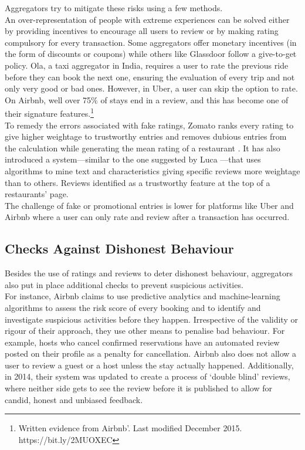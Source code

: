 \documentclass[a4paper, 12pt]{article}
\begin{document}
Aggregators try to mitigate these risks using a few methods.\\

An over-representation of people with extreme experiences can be solved either by providing incentives to encourage all users to review or by making rating compulsory for every transaction. Some aggregators offer monetary incentives (in the form of discounts or coupons) while others like Glassdoor follow a give-to-get policy. Ola, a taxi aggregator in India, requires a user to rate the previous ride before they can book the next one, ensuring the evaluation of every trip and not only very good or bad ones. However, in Uber, a user can skip the option to rate. On Airbnb, well over 75\% of stays end in a review, and this has become one of their signature features.\footnote {Written evidence from Airbnb’. Last modified December 2015. https://bit.ly/2MUOXEC} \\

To remedy the errors associated with fake ratings, Zomato ranks every rating to give higher weightage to trustworthy entries and removes dubious entries from the calculation while generating the mean rating of a restaurant \parencite{GoyalD2012}. It has also introduced a system—similar to the one suggested by Luca \parencite{luca2016reviews}—that uses algorithms to mine text and characteristics giving specific reviews more weightage than to others. Reviews identified as a trustworthy feature at the top of a restaurants’ page. \\

The challenge of fake or promotional entries is lower for platforms like Uber and Airbnb where a user can only rate and review after a transaction has occurred.

                                   
                    \subsection{Checks Against Dishonest Behaviour}
                    
                   Besides the use of ratings and reviews to deter dishonest behaviour, aggregators also put in place additional checks to prevent suspicious activities. \\

For instance, Airbnb claims to use predictive analytics and machine-learning algorithms to assess the risk score of every booking and to identify and investigate suspicious activities before they happen. Irrespective of the validity or rigour of their approach, they use other means to penalise bad behaviour. For example, hosts who cancel confirmed reservations have an automated review posted on their profile as a penalty for cancellation. Airbnb also does not allow a user to review a guest or a host unless the stay actually happened. Additionally, in 2014, their system was updated to create a process of ‘double blind’ reviews, where neither side gets to see the review before it is published to allow for candid, honest and unbiased feedback.  \\
                    
\end{document}
